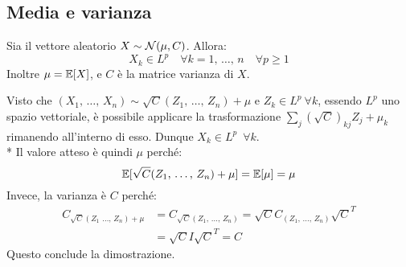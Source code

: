 \subsection{Media e varianza}

\begin{prop}\label{prop-vett-normale-lp}
  Sia il vettore aleatorio $X \sim \mathcal N(\mu, C)$. Allora:
  $$X_k \in L^p \quad \forall k = 1, \, \dots, \, n \quad \forall p \geq 1$$
  Inoltre $\mu = \mathbb E[X]$, e $C$ è la matrice varianza di $X$.
\end{prop}
\begin{dimo}
  Visto che $ (X_1, \, \dots, \, X_n) \sim \sqrt{C} (Z_1, \, \dots, \, Z_n) + \mu$  e $Z_k \in L^p \ \forall k$, essendo $L^p$ uno spazio vettoriale, è possibile applicare la trasformazione $\sum_{j}(\sqrt{C})_{kj} Z_j + \mu_k$ rimanendo all'interno di esso.
  Dunque $X_k \in L^p \enspace \forall k$. \\*
  Il valore atteso è quindi $\mu$ perché:
  $$\mathbb E[\sqrt{C} (Z_1, \, \dots, \, Z_n) + \mu] = \mathbb E[\mu] = \mu$$
  Invece, la varianza è $C$ perché:
  \begin{align*}
  	C_{\sqrt{C}(Z_1\, \, \dots, \, Z_n) + \mu} &= C_{\sqrt{C}(Z_1, \, \dots, \, Z_n)} = \sqrt{C}C_{(Z_1, \, \dots, \, Z_n)}\sqrt{C}^T\\
  	&= \sqrt{C}I\sqrt{C}^T = C
  \end{align*}
Questo conclude la dimostrazione. \qedhere
\end{dimo}


\medskip

